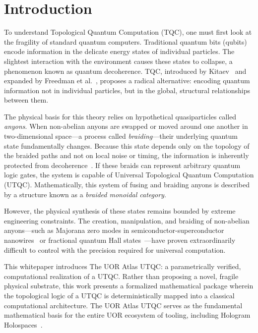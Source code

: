 \section{Introduction}

To understand Topological Quantum Computation (TQC), one must first look at the fragility of standard quantum computers. Traditional quantum bits (qubits) encode information in the delicate energy states of individual particles. The slightest interaction with the environment causes these states to collapse, a phenomenon known as quantum decoherence. TQC, introduced by Kitaev~\cite{kitaev2003} and expanded by Freedman et al.\ \cite{freedman2003}, proposes a radical alternative: encoding quantum information not in individual particles, but in the global, structural relationships between them.

The physical basis for this theory relies on hypothetical quasiparticles called \textit{anyons}. When non-abelian anyons are swapped or moved around one another in two-dimensional space—a process called \textit{braiding}—their underlying quantum state fundamentally changes. Because this state depends only on the topology of the braided paths and not on local noise or timing, the information is inherently protected from decoherence~\cite{nayak2008}. If these braids can represent arbitrary quantum logic gates, the system is capable of Universal Topological Quantum Computation (UTQC). Mathematically, this system of fusing and braiding anyons is described by a structure known as a \textit{braided monoidal category}.

However, the physical synthesis of these states remains bounded by extreme engineering constraints. The creation, manipulation, and braiding of non-abelian anyons---such as Majorana zero modes in semiconductor-superconductor nanowires~\cite{alicea2012} or fractional quantum Hall states~\cite{moore1991}---have proven extraordinarily difficult to control with the precision required for universal computation.

This whitepaper introduces The UOR Atlas UTQC\@: a parametrically verified, computational realization of a UTQC\@. Rather than proposing a novel, fragile physical substrate, this work presents a formalized mathematical package wherein the topological logic of a UTQC is deterministically mapped into a classical computational architecture. The UOR Atlas UTQC serves as the fundamental mathematical basis for the entire UOR ecosystem of tooling, including Hologram Holospaces~\cite{holospaces}. 

